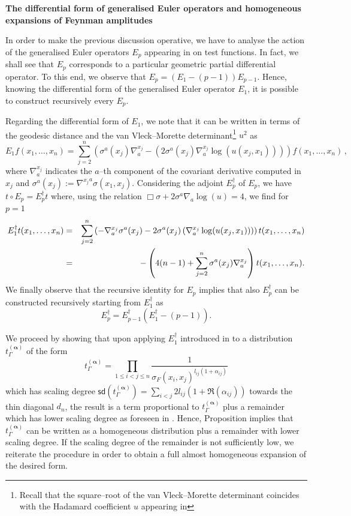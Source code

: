 \documentclass[10pt]{book}
\newcommand{\sd}{\mathsf{sd}}
\theoremstyle{break}
\begin{document}
\bigskip

\bigskip

\textbf{The differential form of generalised Euler operators and homogeneous expansions of Feynman amplitudes}

\bigskip

In order to make the previous discussion operative, we have to analyse the action of the generalised Euler operators $E_p$ appearing in %
on test functions. In fact, we shall see that $E_p$ corresponds to a particular geometric partial differential operator. To this end, we observe that $E_p = (E_1-(p-1)) E_{p-1}$. Hence, knowing the differential form of the generalised Euler operator $E_1$, it is possible to construct recursively every $E_p$.

Regarding the differential form of $E_1$, we note that it can be written in terms of the geodesic distance and the van Vleck--Morette determinant\footnote{Recall that the square--root of the van Vleck--Morette determinant coincides with the Hadamard coefficient $u$ appearing in %
} 
$u^2$  as 
\[
E_1 f(x_1, \dots, x_n) = \sum_{j=2}^n \left(\sigma^a(x_j) \nabla^{x_j}_a  - \left(2  \sigma^a(x_j) \nabla^{x_j}_a  \log (u(x_j,x_1))\right)\right) f(x_1, \dots, x_n)\,,
\]
where $\nabla^{x_j}_a$ indicates the $a$--th component of the covariant derivative computed in $x_j$ and 
$\sigma^a(x_j) := {\nabla^{x_j}}^a\sigma(x_1,x_j)$.
Considering the adjoint $E^\dagger_p$ of $E_p$, we have $t\circ E_p = E^\dagger_p t$ where, using the relation $\Box \sigma + 2\sigma^a\nabla_a \log (u) = 4$, we find for $p=1$
%
\begin{eqnarray}
E_1^\dagger  t(x_1,\dots,x_n)     
&=&  \sum_{j=2}^n \left(- \nabla^{x_j}_a \sigma^a(x_j)    - 2 \sigma^a(x_j) \left(\nabla^{x_j}_a \log (u(x_j,x_1)) \right)\right) t(x_1,\dots,x_n) \notag \\
&=& -\left( 4(n-1) +  \sum_{j=2}^n \sigma^a(x_j) \nabla^{x_j}_a   \right)t(x_1,\dots,x_n).
\end{eqnarray}
%
We finally observe that the recursive identity for $E_p$ implies that also $E^\dagger_p$ can be constructed recursively starting from $E^\dagger_1$ as 
\[
E_p^\dagger =  E_{p-1}^\dagger (E_1^\dagger-(p-1)).
\]

We proceed by showing that upon applying $E^\dagger_1$ introduced in  %
to a distribution $t_\Gamma^{(\boldsymbol{\alpha})}$ of the form
\[
t_\Gamma^{(\boldsymbol{\alpha})}=\prod_{1\leq i < j \leq n } \frac{1}{\sigma_F(x_i,x_j)^{l_{ij}(1+ \alpha_{ij})}}
\]
which has scaling degree $\sd(t_\Gamma^{(\boldsymbol{\alpha})}) = \sum_{i<j} 2 l_{ij}(1+ \Re(\alpha_{ij}))$ towards the thin diagonal $d_n$, the result is a term proportional to $t_\Gamma^{(\boldsymbol{\alpha})}$ plus a remainder which has lower scaling degree as foreseen in %
. Hence, Proposition %
implies that $t_\Gamma^{(\boldsymbol{\alpha})}$ can be written as a homogeneous distribution plus a remainder with lower scaling degree. If the scaling degree of the remainder is not sufficiently low, we reiterate the procedure in order to obtain a full almost homogeneous expansion of the desired form.
\end{document}
